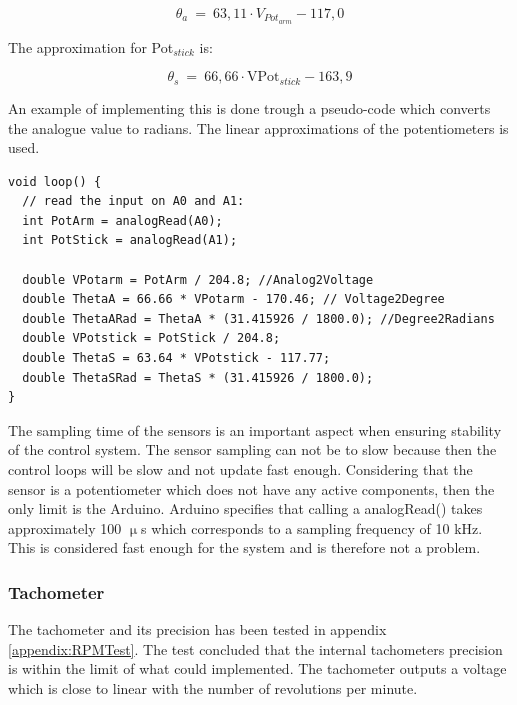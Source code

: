 \begin{equation}
\theta_a\ =\ 63,11 \cdot V_{{Pot}_{arm}} - 117,0
\end{equation}
\startexplain
\stopexplain

The approximation for Pot$_{stick}$ is:

\begin{equation}
\theta_s\ =\ 66,66 \cdot \text{VPot}_{stick} - 163,9
\end{equation}

\startexplain
\stopexplain

An example of implementing this is done trough a pseudo-code which converts the analogue value to radians. The linear approximations of the potentiometers is used.
\begin{lstlisting}
void loop() {
  // read the input on A0 and A1:
  int PotArm = analogRead(A0);
  int PotStick = analogRead(A1);

  double VPotarm = PotArm / 204.8; //Analog2Voltage
  double ThetaA = 66.66 * VPotarm - 170.46; // Voltage2Degree
  double ThetaARad = ThetaA * (31.415926 / 1800.0); //Degree2Radians
  double VPotstick = PotStick / 204.8;
  double ThetaS = 63.64 * VPotstick - 117.77;
  double ThetaSRad = ThetaS * (31.415926 / 1800.0);
}
\end{lstlisting}    

The sampling time of the sensors is an important aspect when ensuring stability of the control system. The sensor sampling can not be to slow because then the control loops will be slow and not update fast enough. Considering that the sensor is a potentiometer which does not have any active components, then the only limit is the Arduino. Arduino specifies that calling a analogRead() takes approximately 100 $\upmu$s which corresponds to a sampling frequency of 10 kHz. This is considered fast enough for the system and is therefore not a problem. 

\subsubsection*{Tachometer}
The tachometer and its precision has been tested in appendix \ref{appendix:RPMTest}. The test concluded that the internal tachometers precision is within the limit of what could implemented. The tachometer outputs a voltage which is close to linear with the number of revolutions per minute.

